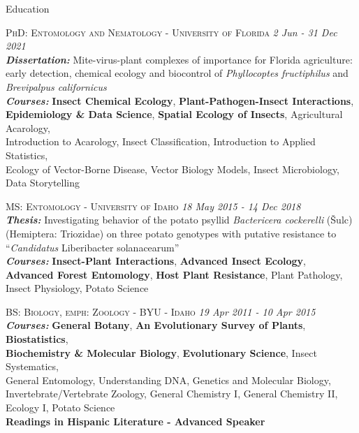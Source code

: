 \documentclass{resume} %
\begin{document}
\begin{rSection}{Education}
	
	\textsc{PhD: Entomology and Nematology - University of Florida} \hfill {\em 2 Jun - 31 Dec 2021}\\
	\textit{\textbf{Dissertation:}} Mite-virus-plant complexes of importance for Florida agriculture: early detection, chemical ecology and biocontrol of \textit{Phyllocoptes fructiphilus} and \textit{Brevipalpus californicus} \\
	\textit{\textbf{Courses:}} \textbf{Insect Chemical Ecology}, \textbf{Plant-Pathogen-Insect Interactions},\\
	\textbf{Epidemiology \& Data Science}, \textbf{Spatial Ecology of Insects}, Agricultural Acarology,\\
	Introduction to Acarology, Insect Classification, Introduction to Applied Statistics,\\
	Ecology of Vector-Borne Disease, Vector Biology Models, Insect Microbiology,\\ Data Storytelling\\ \hfill
	
	\textsc{MS: Entomology - University of Idaho} \hfill {\em 18 May 2015 - 14 Dec 2018}\\
	\textit{\textbf{Thesis:}} Investigating behavior of the potato psyllid \textit{Bactericera cockerelli} (Šulc)\\
	(Hemiptera: Triozidae) on three potato genotypes with putative resistance to\\ “\textit{Candidatus} Liberibacter solanacearum”\\
	\textit{\textbf{Courses:}} \textbf{Insect-Plant Interactions}, \textbf{Advanced Insect Ecology},\\
	\textbf{Advanced Forest Entomology}, \textbf{Host Plant Resistance}, Plant Pathology,\\
	Insect Physiology, Potato Science\\ \hfill
	
	\textsc{BS: Biology, emph: Zoology - BYU - Idaho} \hfill {\em 19 Apr 2011 - 10 Apr 2015}\\ \textit{\textbf{Courses:}} \textbf{General Botany}, \textbf{An Evolutionary Survey of Plants}, \textbf{Biostatistics},\\
	\textbf{Biochemistry \& Molecular Biology}, \textbf{Evolutionary Science}, Insect Systematics,\\
	General Entomology, Understanding DNA, Genetics and Molecular Biology, Invertebrate/Vertebrate Zoology, General Chemistry I, General Chemistry II, Ecology I, Potato Science\\
	\textbf{Readings in Hispanic Literature - Advanced Speaker}\\ \hfill
	
\end{rSection}
\end{document}
